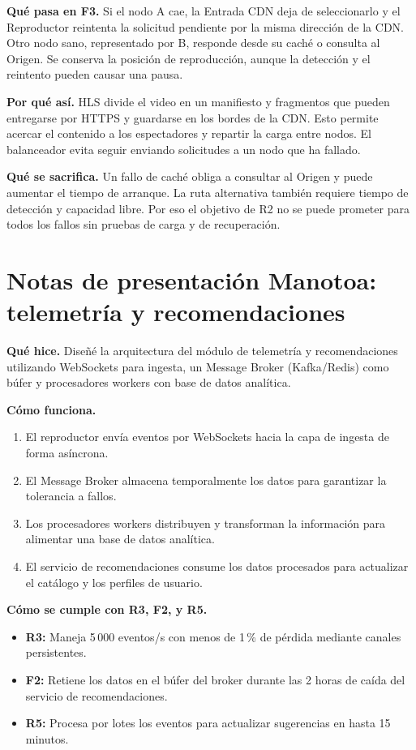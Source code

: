 \documentclass[11pt,a4paper]{article}
\begin{document}
	\textbf{Qu\'e pasa en F3.} Si el nodo A cae, la Entrada CDN deja de seleccionarlo y el Reproductor reintenta la solicitud pendiente por la misma direcci\'on de la CDN. Otro nodo sano, representado por B, responde desde su cach\'e o consulta al Origen. Se conserva la posici\'on de reproducci\'on, aunque la detecci\'on y el reintento pueden causar una pausa.

	\textbf{Por qu\'e as\'i.} HLS divide el video en un manifiesto y fragmentos que pueden entregarse por HTTPS y guardarse en los bordes de la CDN. Esto permite acercar el contenido a los espectadores y repartir la carga entre nodos. El balanceador evita seguir enviando solicitudes a un nodo que ha fallado.

	\textbf{Qu\'e se sacrifica.} Un fallo de cach\'e obliga a consultar al Origen y puede aumentar el tiempo de arranque. La ruta alternativa tambi\'en requiere tiempo de detecci\'on y capacidad libre. Por eso el objetivo de R2 no se puede prometer para todos los fallos sin pruebas de carga y de recuperaci\'on.
	
	\section*{Notas de presentaci\'on Manotoa: telemetr\'ia y recomendaciones}
    \textbf{Qu\'e hice.} Dise\~n\'e la arquitectura del m\'odulo de telemetr\'ia y recomendaciones utilizando WebSockets para ingesta, un Message Broker (Kafka/Redis) como b\'ufer y procesadores workers con base de datos anal\'itica.

    \textbf{C\'omo funciona.}
    \begin{enumerate}[leftmargin=*,itemsep=2pt]
        \item El reproductor env\'ia eventos por WebSockets hacia la capa de ingesta de forma as\'incrona.
        \item El Message Broker almacena temporalmente los datos para garantizar la tolerancia a fallos.
        \item Los procesadores workers distribuyen y transforman la informaci\'on para alimentar una base de datos anal\'itica.
        \item El servicio de recomendaciones consume los datos procesados para actualizar el cat\'alogo y los perfiles de usuario.
    \end{enumerate}

    \textbf{C\'omo se cumple con R3, F2, y R5.} 
    \begin{itemize}[leftmargin=*,itemsep=2pt]
        \item \textbf{R3:} Maneja 5\,000 eventos/s con menos de 1\,\% de p\'erdida mediante canales persistentes.
        \item \textbf{F2:} Retiene los datos en el b\'ufer del broker durante las 2 horas de caída del servicio de recomendaciones.
        \item \textbf{R5:} Procesa por lotes los eventos para actualizar sugerencias en hasta 15 minutos.
    \end{itemize}
\end{document}
